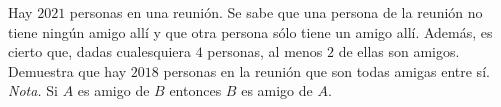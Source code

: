 Hay $2021$ personas en una reunión. Se sabe que una persona de la reunión no tiene ningún amigo allí y que otra persona sólo tiene un amigo allí. Además, es cierto que, dadas cualesquiera $4$ personas, al menos $2$ de ellas son amigos. Demuestra que hay $2018$ personas en la reunión que son todas amigas entre sí. \\
\textit{Nota.} Si $A$ es amigo de $B$ entonces $B$ es amigo de $A$.
